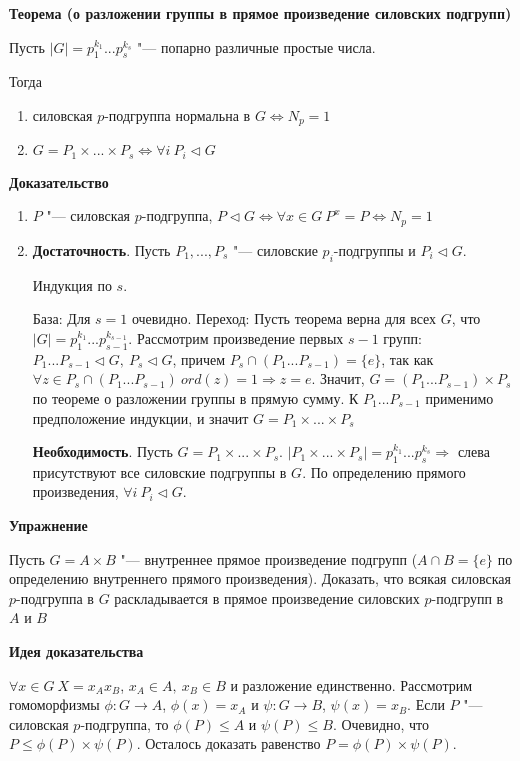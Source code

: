 \documentclass{article}
\begin{document}
\textbf{Теорема (о разложении группы в прямое произведение силовских подгрупп)}

Пусть $|G| = p_1^{k_1}...p_s^{k_s}$ "--- попарно различные простые числа.

Тогда
\begin{enumerate}
	\item силовская $p$-подгруппа нормальна в $G \Leftrightarrow N_p = 1$
	\item $G = P_1 \times ... \times P_s \Leftrightarrow \forall i \ P_i \triangleleft G$
\end{enumerate}

\textbf{Доказательство}

\begin{enumerate}
	\item $P$ "--- силовская $p$-подгруппа, $P \triangleleft G \Leftrightarrow \forall x \in G \ P^x = P \Leftrightarrow N_p = 1$
	\item \textbf{Достаточность}. Пусть $P_1, ..., P_s$ "--- силовские $p_i$-подгруппы и $P_i \triangleleft G$.
	
	Индукция по $s$.
	
	База: Для $s = 1$ очевидно.
	Переход: Пусть теорема верна для всех $G$, что $|G| = p_1^{k_1}...p_{s-1}^{k_{s-1}}$. Рассмотрим произведение первых $s-1$ групп: $P_1...P_{s-1} \triangleleft G, \ P_s \triangleleft G$, причем $P_s \cap (P_1...P_{s-1}) = \{e\}$, так как $\forall z \in P_s \cap (P_1...P_{s-1}) \ ord(z) = 1 \Rightarrow z = e$. Значит, $G = (P_1...P_{s-1}) \times P_s$ по теореме о разложении группы в прямую сумму. К $P_1...P_{s-1}$ применимо предположение индукции, и значит $G = P_1 \times...\times P_s$
	
	\textbf{Необходимость}. Пусть $G = P_1 \times ... \times P_s$. $|P_1 \times ... \times P_s| = p_1^{k_1}...p_s^{k_s} \Rightarrow$ слева присутствуют все силовские подгруппы в $G$. По определению прямого произведения, $\forall i \ P_i \triangleleft G$.
\end{enumerate}

\vspace{10pt}

\textbf{Упражнение}

Пусть $G = A \times B$ "--- внутреннее прямое произведение подгрупп ($A \cap B = \{e\}$ по определению внутреннего прямого произведения). Доказать, что всякая силовская $p$-подгруппа в $G$ раскладывается в прямое произведение силовских $p$-подгрупп в $A$ и $B$

\vspace{5pt}

\textbf{Идея доказательства}

$\forall x \in G \ X = x_Ax_B$, $x_A \in A, \ x_B \in B$ и разложение единственно. Рассмотрим гомоморфизмы $\phi: G \rightarrow A$, $\phi(x) = x_A$ и $\psi: G \rightarrow B$, $\psi(x) = x_B$. Если $P$ "--- силовская $p$-подгруппа, то $\phi(P) \leq A$ и $\psi(P) \leq B$. Очевидно, что $P \leq \phi(P) \times \psi(P)$. Осталось доказать равенство $P = \phi(P) \times \psi(P)$.
\end{document}
